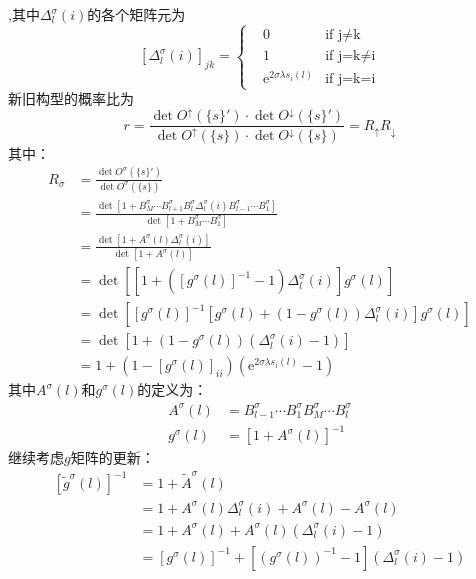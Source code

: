 \documentclass[UTF8,cs4size]{ctexart}
\def\ee{\mathrm e}
\begin{document}
,其中$\Delta^{\sigma}_{l}(i)$的各个矩阵元为
\[
    [\Delta^{\sigma}_{l}(i)]_{jk}=
    \left\{
        \begin{aligned}
            &0 &\text{if j$\neq$k} \\
            &1 &\text{if j=k$\neq$i}\\
            &\ee^{2\sigma \lambda s_{i}(l)} &\text{if j=k=i}
        \end{aligned}
    \right. 
\]
新旧构型的概率比为
\[
    r=\frac{\det O^{\uparrow}(\{s\}') \cdot \det O^{\downarrow} (\{s\}')}
    {\det O^{\uparrow}(\{s\}) \cdot \det O^{\downarrow} (\{s\})}
    =R_{\uparrow} R_{\downarrow}
\]
其中：
\[
    \begin{aligned}
        R_{\sigma} &=\frac{\det O^{\sigma}(\{s\}')}{\det O^{\sigma}(\{s\})}\\
        &=\frac{\det [1+B^{\sigma}_{M} \cdots B^{\sigma}_{l+1} B^{\sigma}_{l} 
        \Delta^{\sigma}_{l}(i) B^{\sigma}_{l-1} \cdots B^{\sigma}_{1}]}
        {\det [1+B^{\sigma}_{M} \cdots B^{\sigma}_{1}]}\\
        &=\frac{\det [1+A^{\sigma} (l) \Delta^{\sigma}_{l}(i)]}
        {\det [1+ A^{\sigma}(l)]}\\
        &=\det \left[\left[1+ \left([g^{\sigma}(l)]^{-1} -1 \right) \Delta^{\sigma}_{l}(i)
        \right] g^{\sigma} (l)\right]\\
        &=\det [[g^{\sigma} (l)]^{-1} \left[g^{\sigma} (l) +\left( 1 - g^{\sigma}(l) \right)\Delta^{\sigma}_{l}(i) \right] g^{\sigma} (l)]\\
        &=\det[1+(1-g^{\sigma}(l))(\Delta^{\sigma}_{l}(i)-1)]\\
        &=1+(1-[g^{\sigma}(l)]_{ii})(\ee^{2\sigma \lambda s_{i}(l)}-1)
    \end{aligned}
\]
其中$A^{\sigma}(l)$和$g^{\sigma}(l)$的定义为：
\[
    \begin{aligned}
        A^{\sigma} (l) &= B^{\sigma}_{l-1} \cdots B^{\sigma}_{1} B^{\sigma}_{M} \cdots B^{\sigma}_{l}\\
        g^{\sigma} (l) &= [1+A^{\sigma}(l)]^{-1}
    \end{aligned}    
\]
继续考虑$g$矩阵的更新：
\[
    \begin{aligned}
        \left[ \tilde{g}^{\sigma} (l) \right]^{-1} &= 1 + \tilde{A}^{\sigma}(l) \\
        &= 1 + A^{\sigma}(l) \Delta^{\sigma}_{l}(i) + A^{\sigma}(l) - A^{\sigma}(l) \\
        &= 1 + A^{\sigma}(l) + A^{\sigma}(l) \left(\Delta^{\sigma}_{l} (i) - 1 \right) \\
        &= \left[g^{\sigma}(l) \right]^{-1} 
            + \left[ \left(g^{\sigma}(l) \right)^{-1} -1 \right]
            \left(\Delta^{\sigma}_{l} (i) - 1 \right)\\
    \end{aligned}
\]
\end{document}
